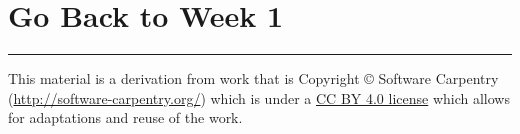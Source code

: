 \documentclass[
]{article}
\begin{document}
\hypertarget{go-back-to-week-1}{%
\section{Go Back to Week 1 }\label{go-back-to-week-1}}

\begin{center}\rule{0.5\linewidth}{0.5pt}\end{center}

This material is a derivation from work that is Copyright © Software
Carpentry (\url{http://software-carpentry.org/}) which is under a
\href{https://creativecommons.org/licenses/by/4.0/}{CC BY 4.0 license}
which allows for adaptations and reuse of the work.
\end{document}
